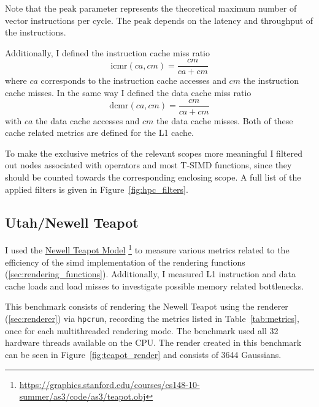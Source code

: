 \documentclass[a4paper, 11pt]{memoir}
\begin{document}
    Note that the $\text{peak}$ parameter represents the theoretical maximum number of vector instructions per cycle. The
    $\text{peak}$ depends on the \gls{latency} and \gls{throughput} of the instructions.

    Additionally, I defined the instruction cache miss ratio
    \begin{equation}
        \text{icmr}(ca, cm) = \frac{cm}{ca + cm}
    \end{equation}
    where $ca$ corresponds to the instruction cache accesses and $cm$ the instruction cache misses. In the same way I defined
    the data cache miss ratio
    \begin{equation}
        \text{dcmr}(ca, cm) = \frac{cm}{ca + cm}
    \end{equation}
    with $ca$ the data cache accesses and $cm$ the data cache misses. Both of these cache related metrics are defined
    for the L1 cache.

    To make the exclusive metrics of the relevant scopes more meaningful I filtered out nodes associated with operators
    and most T-SIMD functions, since they should be counted towards the corresponding enclosing scope. A full list of the
    applied filters is given in Figure~\ref{fig:hpc_filters}.

    \subsection{Utah/Newell Teapot}
    \label{sec:utah_teapot}
    I used the \href{https://graphics.stanford.edu/courses/cs148-10-summer/as3/code/as3/teapot.obj}{Newell Teapot Model}
    \footnote{\href{https://graphics.stanford.edu/courses/cs148-10-summer/as3/code/as3/teapot.obj}{https://graphics.stanford.edu/courses/cs148-10-summer/as3/code/as3/teapot.obj}}
    to measure various metrics related to the efficiency of the \gls{simd} implementation of the rendering functions (\ref{sec:rendering_functions}).
    Additionally, I measured L1 instruction and data cache loads and load misses to investigate possible memory related
    bottlenecks.

    This benchmark consists of rendering the Newell Teapot using the renderer (\ref{sec:renderer}) via \texttt{hpcrun},
    recording the metrics listed in Table~\ref{tab:metrics}, once for each multithreaded rendering mode. The benchmark
    used all 32 hardware threads available on the CPU. The render created in this benchmark can be seen in
    Figure~\ref{fig:teapot_render} and consists of 3644 Gaussians.
\end{document}
